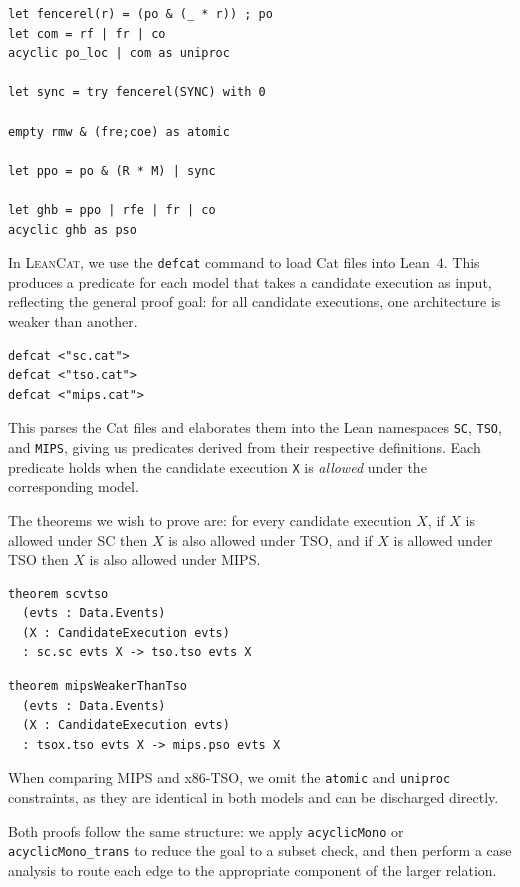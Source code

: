\begin{lstlisting}[]
let fencerel(r) = (po & (_ * r)) ; po
let com = rf | fr | co
acyclic po_loc | com as uniproc

let sync = try fencerel(SYNC) with 0

empty rmw & (fre;coe) as atomic

let ppo = po & (R * M) | sync

let ghb = ppo | rfe | fr | co
acyclic ghb as pso
\end{lstlisting}

In \textsc{LeanCat}, we use the \texttt{defcat} command to load Cat files into Lean~4. This produces 
a predicate for each model that takes a candidate execution as input, reflecting the 
general proof goal: for all candidate executions, one architecture is weaker than another.

\begin{lstlisting}[]
defcat <"sc.cat">
defcat <"tso.cat">
defcat <"mips.cat">
\end{lstlisting}

\noindent
This parses the Cat files and elaborates them into the Lean namespaces \texttt{SC}, 
\texttt{TSO}, and \texttt{MIPS}, giving us predicates derived from their respective 
definitions. Each predicate holds when the candidate execution \texttt{X} is 
\emph{allowed} under the corresponding model.

The theorems we wish to prove are: for every candidate execution $X$, if $X$ is allowed 
under SC then $X$ is also allowed under TSO, and if $X$ is allowed under TSO then $X$ 
is also allowed under MIPS.

\begin{lstlisting}[]
theorem scvtso
  (evts : Data.Events)
  (X : CandidateExecution evts)
  : sc.sc evts X -> tso.tso evts X
\end{lstlisting}

\begin{lstlisting}[]
theorem mipsWeakerThanTso
  (evts : Data.Events)
  (X : CandidateExecution evts)
  : tsox.tso evts X -> mips.pso evts X
\end{lstlisting}

When comparing MIPS and x86-TSO, we omit the \texttt{atomic} and \texttt{uniproc} 
constraints, as they are identical in both models and can be discharged directly.

Both proofs follow the same structure: we apply \texttt{acyclicMono} or 
\texttt{acyclicMono\_trans} to reduce the goal to a subset check, and then perform 
a case analysis to route each edge to the appropriate component of the larger relation.

